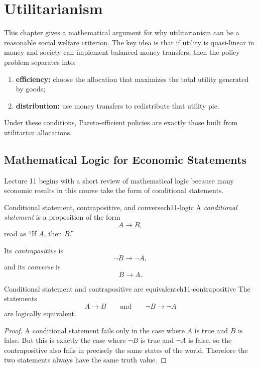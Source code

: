 
\section{Utilitarianism}

This chapter gives a mathematical argument for why utilitarianism can be a reasonable social welfare criterion. The key idea is that if utility is quasi-linear in money and society can implement balanced money transfers, then the policy problem separates into:
\begin{enumerate}
    \item \textbf{efficiency:} choose the allocation that maximizes the total utility generated by goods;
    \item \textbf{distribution:} use money transfers to redistribute that utility pie.
\end{enumerate}
Under these conditions, Pareto-efficient policies are exactly those built from utilitarian allocations.

\subsection{Mathematical Logic for Economic Statements}

Lecture 11 begins with a short review of mathematical logic because many economic results in this course take the form of conditional statements.

\begin{definition}{Conditional statement, contrapositive, and converse}{ch11-logic}
A \emph{conditional statement} is a proposition of the form
\[
A \to B,
\]
read as ``If $A$, then $B$.''

Its \emph{contrapositive} is
\[
\neg B \to \neg A,
\]
and its \emph{converse} is
\[
B \to A.
\]
\end{definition}

\begin{theorem}{Conditional statement and contrapositive are equivalent}{ch11-contrapositive}
The statements
\[
A \to B
\qquad \text{and} \qquad
\neg B \to \neg A
\]
are logically equivalent.
\end{theorem}

\begin{proof}
A conditional statement fails only in the case where $A$ is true and $B$ is false. But this is exactly the case where $\neg B$ is true and $\neg A$ is false, so the contrapositive also fails in precisely the same states of the world. Therefore the two statements always have the same truth value.
\end{proof}

